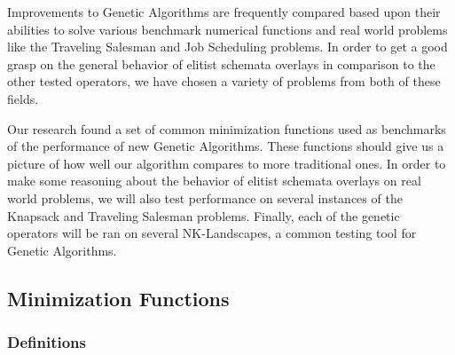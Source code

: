 Improvements to Genetic Algorithms are frequently compared based upon their abilities to solve various benchmark numerical functions and real world problems like the Traveling Salesman and Job Scheduling problems\cite{molga05}. In order to get a good grasp on the general behavior of elitist schemata overlays in comparison to the other tested operators, we have chosen a variety of problems from both of these fields. 

Our research found a set of common minimization functions used as benchmarks of the performance of new Genetic Algorithms\cite{Deb99,Eiben95,Tsutsui99}. These functions should give us a picture of how well our algorithm compares to more traditional ones. In order to make some reasoning about the behavior of elitist schemata overlays on real world problems, we will also test performance on several instances of the Knapsack and Traveling Salesman problems. Finally, each of the genetic operators will be ran on several NK-Landscapes, a common testing tool for Genetic Algorithms.

\subsection*{Minimization Functions}
\subsubsection*{Definitions}

